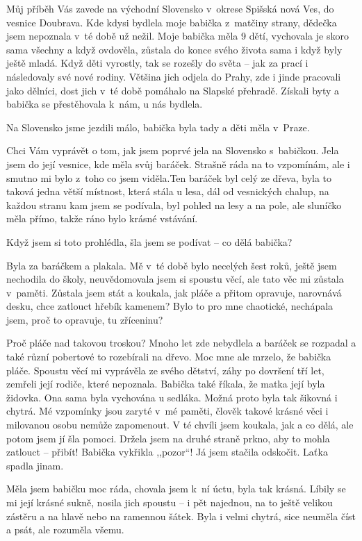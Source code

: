 \noindent
Můj příběh Vás zavede na východní Slovensko v okrese Spišská nová Ves, do vesnice Doubrava. Kde kdysi bydlela  moje babička z matčiny strany, dědečka jsem nepoznala v té době už nežil. Moje babička měla 9 dětí, vychovala je skoro sama všechny a když ovdověla, zůstala do konce svého života sama i když byly ještě mladá. Když děti vyrostly, tak se rozešly do světa – jak za prací i následovaly své nové rodiny. Většina jich odjela do Prahy, zde i jinde pracovali jako dělníci, dost jich v té době pomáhalo na Slapské přehradě. Získali byty a babička se přestěhovala k nám, u nás bydlela.

Na Slovensko jsme jezdili málo, babička byla tady a děti měla v Praze.

Chci Vám vyprávět o tom, jak jsem poprvé jela na Slovensko s babičkou. Jela jsem do její vesnice, kde měla svůj baráček. Strašně ráda na to vzpomínám, ale i smutno mi bylo z toho co jsem viděla.Ten baráček byl celý ze dřeva, byla to taková  jedna větší místnost, která stála u lesa,  dál od vesnických chalup, na každou stranu kam  jsem se podívala, byl pohled na lesy a na pole, ale sluníčko měla přímo, takže ráno bylo krásné vstávání.

Když jsem si toto prohlédla, šla jsem se podívat -- co dělá babička?

Byla za baráčkem a plakala. Mě v té době bylo necelých šest roků, ještě jsem nechodila do školy, neuvědomovala jsem si spoustu věcí, ale tato věc mi zůstala v paměti. Zůstala jsem stát a koukala, jak pláče a přitom opravuje, narovnává desku, chce zatlouct hřebík kamenem? Bylo to pro mne chaotické, nechápala jsem, proč to opravuje, tu zříceninu?

Proč pláče nad takovou troskou? Mnoho let zde nebydlela a baráček se rozpadal a také různí pobertové to rozebírali na dřevo. Moc mne ale mrzelo, že babička pláče. Spoustu věcí mi vyprávěla ze svého dětství, záhy po dovršení tří let, zemřeli její rodiče, které nepoznala. Babička také říkala, že matka její byla židovka. Ona sama byla vychována u sedláka. Možná proto byla tak šikovná i chytrá. Mé vzpomínky jsou zaryté v mé paměti, člověk takové krásné věci i milovanou osobu nemůže zapomenout. V té chvíli jsem koukala, jak a co dělá, ale potom jsem jí šla pomoci. Držela jsem na druhé straně prkno, aby to mohla zatlouct -- přibít! Babička vykřikla ,,pozor``! Já jsem stačila odskočit. Laťka spadla jinam.

Měla jsem babičku moc ráda, chovala jsem k ní úctu, byla tak krásná. Líbily se mi její krásné sukně, nosila jich spoustu -- i pět najednou, na to ještě velikou zástěru a na hlavě nebo na ramennou šátek. Byla i velmi chytrá, sice neuměla číst a psát, ale rozuměla všemu.

